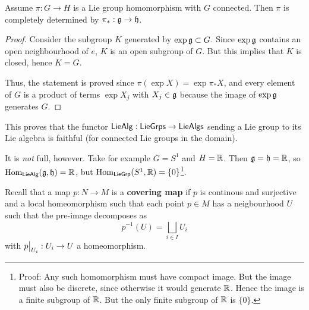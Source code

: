 \documentclass[11pt, english]{article}
\begin{document}
\begin{prop}
  Assume $\pi:G \to H$ is a Lie group homomorphism with $G$ connected. Then $\pi$ is completely determined by $\pi_\ast: \mathfrak g \to \mathfrak h$. 
\end{prop}

\begin{proof}
  Consider the subgroup $K$ generated by $\exp \mathfrak g \subset G$. Since $\exp \mathfrak g$ contains an open neighbourhood of $e$, $K$ is an open subgroup of $G$. But this implies that $K$ is closed, hence $K=G$.

Thus, the statement is proved since  $\pi(\exp X) = \exp \pi_\ast X$, and every element of $G$ is a product of terms  $\exp X_j$ with $X_j \in \mathfrak g$ because the image of $\exp \mathfrak g$ generates $G$.
\end{proof}

\begin{remark}
  This proves that the functor $\mathsf{LieAlg}:\mathsf{LieGrps} \to \mathsf{LieAlgs}$ sending a Lie group to its Lie algebra is faithful (for connected Lie groups in the domain).

It is \emph{not} full, however. Take for example $G=S^1$ and $H=\mathbb{R}$. Then $\mathfrak g = \mathfrak h = \mathbb{R}$, so $\operatorname{Hom}_{\mathsf{LieAlg}}(\mathfrak g,\mathfrak h)=\mathbb{R}$, but $\operatorname{Hom}_{\mathsf{LieGrp}}(S^1,\mathbb{R}) = \{ 0\}$\footnote{Proof: Any such homomorphism must have compact image. But the image must also be discrete, since otherwise it would generate $\mathbb{R}$. Hence the image is a finite subgroup of $\mathbb{R}$. But the only finite subgroup of $\mathbb{R}$ is $\{0 \}$.}.
\end{remark}

Recall that a map $p:N \to M$ is a \textbf{covering map} if $p$ is continous and surjective and a local homeomorphism such that each point $p \in M$ has a neigbourhood $U$ such that the pre-image decomposes as
$$
p^{-1}(U) = \bigsqcup_{i \in I} U_i
$$
with $\restr{p}{U_i}:U_i \to U$ a homeomorphism.
\end{document}
